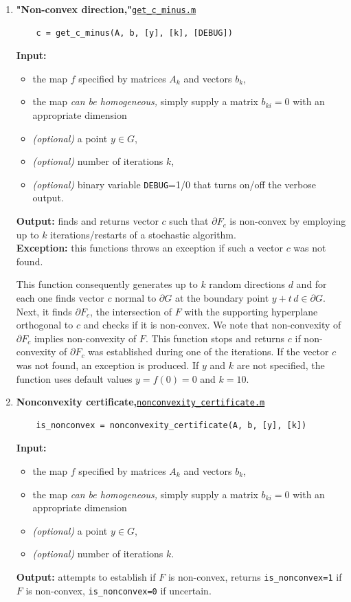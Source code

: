 \documentclass[a4paper]{article}
\theoremstyle{definition}
\begin{document}
\begin{enumerate}

\item {\bf "Non-convex direction,"\hskip 6pt}\underline{\tt  get\_c\_minus.m} 
	\begin{verbatim}
	c = get_c_minus(A, b, [y], [k], [DEBUG])
	\end{verbatim}
{\bf Input:}
\begin{itemize}
	\item the map $f$ specified by matrices $A_k$ and vectors $b_k$,
	\item the map {\it can be homogeneous,} simply supply a matrix $b_{ki}=0$ with an appropriate dimension
	\item {\it (optional)} a point $y\in G$,
	\item {\it (optional)} number of iterations $k$,
	\item {\it (optional)} binary variable {\tt DEBUG}=1/0 that turns on/off the verbose output.
\end{itemize}
{\bf Output:}  finds and returns vector $c$ such that $\partial F_c$ is non-convex by employing up to $k$ iterations/restarts of a stochastic algorithm.\\
{\bf Exception:} this functions throws an exception if such a vector $c$ was not found.

This function consequently generates up to $k$ random directions $d$ and for each one finds vector $c$ normal to $\partial G$ at the boundary point $y+t\, d\in \partial G$.
Next, it finds $\partial F_c$, the intersection of $F$ with the supporting hyperplane orthogonal to $c$ and checks if it is non-convex.
We note that non-convexity of $\partial F_c$ implies non-convexity of $F$.
This function stops and returns $c$ if non-convexity of $\partial F_c$ was established during one of the iterations. If the vector $c$ was not found, an exception is produced.
If $y$ and $k$ are not specified, the function uses default values $y=f(0)=0$ and $k=10$.


\item {\bf Nonconvexity certificate,\hskip 6pt}\underline{\tt  nonconvexity\_certificate.m} 
	\begin{verbatim}
	is_nonconvex = nonconvexity_certificate(A, b, [y], [k])
	\end{verbatim}
{\bf Input:}
\begin{itemize}
	\item the map $f$ specified by matrices $A_k$ and vectors $b_k$,
	\item the map {\it can be homogeneous,} simply supply a matrix $b_{ki}=0$ with an appropriate dimension
	\item {\it (optional)} a point $y\in G$,
	\item {\it (optional)} number of iterations $k$.
\end{itemize}
{\bf Output:} attempts to establish if $F$ is non-convex, returns {\tt is\_nonconvex=1} if $F$ is non-convex,  {\tt is\_nonconvex=0} if uncertain.\\


\end{enumerate}
\end{document}
